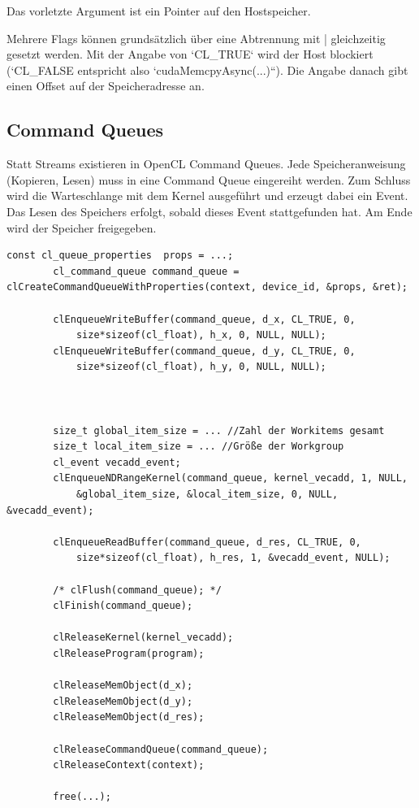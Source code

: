 			Das vorletzte Argument ist ein Pointer auf den Hostspeicher.
			
			Mehrere Flags können grundsätzlich über eine Abtrennung mit | gleichzeitig gesetzt werden. Mit der Angabe von \li`CL_TRUE` wird der Host blockiert (\li`CL_FALSE entspricht also \li`cudaMemcpyAsync(...)``). Die Angabe danach gibt einen Offset auf der Speicheradresse an.
							
			\subsection{Command Queues}
			Statt \Glspl{Stream} existieren in OpenCL \Glspl{Command Queue}. Jede Speicheranweisung (Kopieren, Lesen) muss in eine \Gls{Command Queue} eingereiht werden. Zum Schluss wird die Warteschlange mit dem \Gls{Kernel} ausgeführt und erzeugt dabei ein Event. Das Lesen des Speichers erfolgt, sobald dieses Event stattgefunden hat. Am Ende wird der Speicher freigegeben.
			
		\begin{lstlisting}[caption=Command Queues und Clean-Up]
		const cl_queue_properties  props = ...; 
		cl_command_queue command_queue = clCreateCommandQueueWithProperties(context, device_id, &props, &ret);
		
		clEnqueueWriteBuffer(command_queue, d_x, CL_TRUE, 0, 
			size*sizeof(cl_float), h_x, 0, NULL, NULL);	
		clEnqueueWriteBuffer(command_queue, d_y, CL_TRUE, 0, 
			size*sizeof(cl_float), h_y, 0, NULL, NULL);
				
				
				
		size_t global_item_size = ... //Zahl der Workitems gesamt
		size_t local_item_size = ... //Größe der Workgroup
		cl_event vecadd_event;
		clEnqueueNDRangeKernel(command_queue, kernel_vecadd, 1, NULL, 
			&global_item_size, &local_item_size, 0, NULL, &vecadd_event);
		
		clEnqueueReadBuffer(command_queue, d_res, CL_TRUE, 0, 
			size*sizeof(cl_float), h_res, 1, &vecadd_event, NULL);  
			
		/* clFlush(command_queue); */
		clFinish(command_queue);
		
		clReleaseKernel(kernel_vecadd);
		clReleaseProgram(program);
  
		clReleaseMemObject(d_x);
		clReleaseMemObject(d_y);
		clReleaseMemObject(d_res);

		clReleaseCommandQueue(command_queue);
		clReleaseContext(context);

		free(...);
		\end{lstlisting}
		
